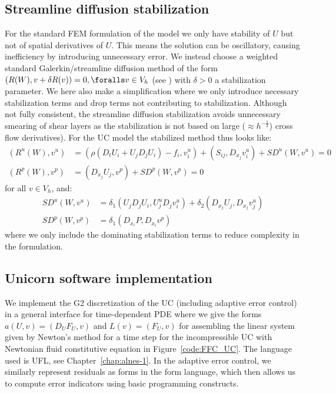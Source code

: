\subsection{Streamline diffusion stabilization}

For the standard FEM formulation of the model we only have stability
of $U$ but not of spatial derivatives of $U$. This means the solution
can be oscillatory, causing inefficiency by introducing unnecessary
error. We instead choose a weighted standard Galerkin/streamline
diffusion method of the form $(R(W), v + \delta R(v)) = 0, \foralls v
\in V_h$ (see \citet{ErikssonEstepHansboEtAl1996}) with $\delta > 0$ a
stabilization parameter. We here also make a simplification where we only
introduce necessary stabilization terms and drop terms not contributing to
stabilization. Although not fully consistent, the streamline diffusion
stabilization avoids unnecessary smearing of shear layers as the
stabilization is not based on large ($\approx h^{-\frac{1}{2}}$) cross
flow derivatives). For the UC model the stabilized method thus looks like:
\begin{align}
  (R^u(W), v^u) &= (\rho(D_t U_i + U_j D_j U_i) - f_i, v^u_i) + (S_{ij}, D_{x_j} v^u_i) + SD^u(W, v^u) = 0\\
  (R^p(W), v^p) &= (D_{x_j} U_j, v^p) + SD^p(W, v^p) = 0
\end{align}
for all $v \in V_h$, and:
\begin{align}
  SD^u(W, v^u) &= \delta_1 (U_j D_j U_i, U^u_j D_j v^u_i) +
  \delta_2 (D_{x_j} U_j, D_{x_j} v^u_j)\\
  SD^p(W, v^p) &= \delta_1 (D_{x_i} P, D_{x_i} v^p)
\end{align}
where we only include the dominating stabilization terms to reduce
complexity in the formulation.

\subsection{Unicorn software implementation}

We implement the G2 discretization of the UC (including adaptive
error control) in a general interface for time-dependent PDE where
we give the forms $a(U, v) = (D_U F_U, v)$ and $L(v) = (F_U, v)$
for assembling the linear system given by Newton's method for a time
step for the incompressible UC with Newtonian fluid constitutive
equation in Figure~\ref{code:FFC_UC}. The language used is UFL, see
Chapter~\ref{chap:alnes-1}. In the adaptive error control, we similarly
represent residuals as forms in the form language, which then allows us
to compute error indicators using basic programming constructs.

